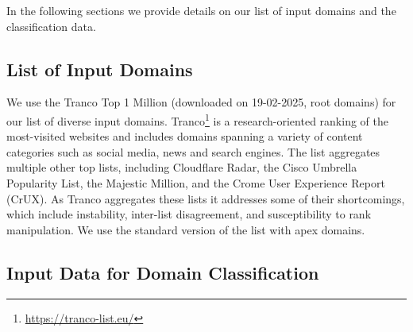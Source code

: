 
In the following sections we provide details on our list of input domains and the classification data.

\subsection{List of Input Domains}
\label{sec:dataset:input_domains}

We use the Tranco Top 1 Million (downloaded on 19-02-2025, root domains) for our list of diverse input domains.
Tranco\footnote{\url{https://tranco-list.eu/}} is a research-oriented ranking
of the most-visited websites and includes domains spanning a variety of content
categories such as social media, news and search engines.
The list aggregates multiple other top lists, including Cloudflare Radar, the
Cisco Umbrella Popularity List, the Majestic Million, and the Crome User
Experience Report (CrUX). As Tranco aggregates these lists it addresses some of
their shortcomings, which include instability, inter-list disagreement, and
susceptibility to rank manipulation.
We use the standard version of the list with apex domains.

\subsection{Input Data for Domain Classification}
\label{sec:dataset:classification_data}


